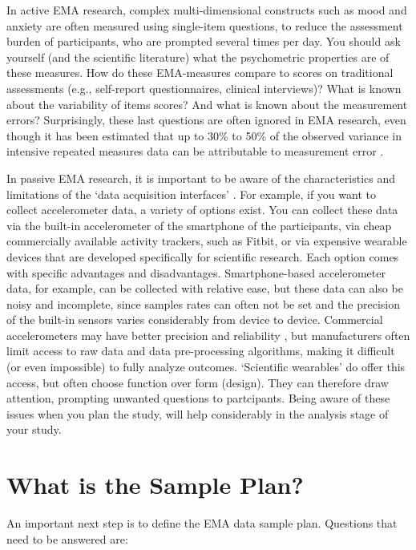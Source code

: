 \documentclass[]{book}
\begin{document}
In active EMA research, complex multi-dimensional constructs such as
mood and anxiety are often measured using single-item questions, to
reduce the assessment burden of participants, who are prompted several
times per day. You should ask yourself (and the scientific literature)
what the psychometric properties are of these measures. How do these
EMA-measures compare to scores on traditional assessments (e.g.,
self-report questionnaires, clinical interviews)? What is known about
the variability of items scores? And what is known about the measurement
errors? Surprisingly, these last questions are often ignored in EMA
research, even though it has been estimated that up to 30\% to 50\% of
the observed variance in intensive repeated measures data can be
attributable to measurement error \citep{Schuurman2015}.

In passive EMA research, it is important to be aware of the
characteristics and limitations of the `data acquisition interfaces'
\citep{Stone2002}. For example, if you want to collect accelerometer
data, a variety of options exist. You can collect these data via the
built-in accelerometer of the smartphone of the participants, via cheap
commercially available activity trackers, such as Fitbit, or via
expensive wearable devices that are developed specifically for
scientific research. Each option comes with specific advantages and
disadvantages. Smartphone-based accelerometer data, for example, can be
collected with relative ease, but these data can also be noisy and
incomplete, since samples rates can often not be set and the precision
of the built-in sensors varies considerably from device to device.
Commercial accelerometers may have better precision and reliability
\citep[see, e.g.,][]{Evenson2015}, but manufacturers often limit access
to raw data and data pre-processing algorithms, making it difficult (or
even impossible) to fully analyze outcomes. `Scientific wearables' do
offer this access, but often choose function over form (design). They
can therefore draw attention, prompting unwanted questions to
partcipants. Being aware of these issues when you plan the study, will
help considerably in the analysis stage of your study.

\section{What is the Sample Plan?}\label{what-is-the-sample-plan}


An important next step is to define the EMA data sample plan. Questions
that need to be answered are:
\end{document}
